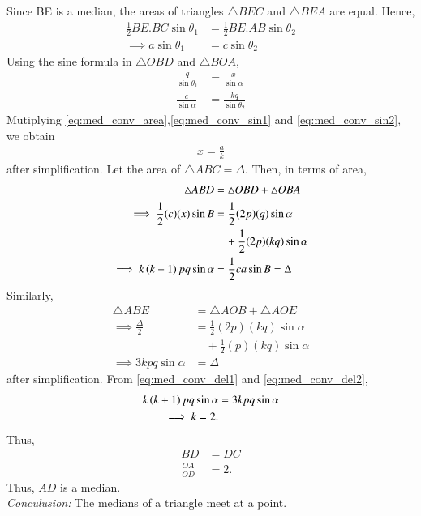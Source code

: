 \proof Since BE is a median, the areas of  triangles  $\triangle BEC$ and $\triangle BEA$ are equal. Hence,
\begin{align}
\frac{1}{2}BE.BC\sin \theta_1 &= \frac{1}{2}BE.AB\sin \theta_2
\\
\implies a\sin \theta_1 &= c\sin \theta_2
\label{eq:med_conv_area}
\end{align}
%
Using the sine formula in $\triangle OBD$ and $\triangle BOA$,
\begin{align}
\label{eq:med_conv_sin1}
\frac{q}{\sin \theta_1} &= \frac{x}{\sin \alpha} 
\\
\frac{c}{\sin \alpha} &= \frac{kq}{\sin \theta_2}
\label{eq:med_conv_sin2}
\end{align}
Mutiplying \eqref{eq:med_conv_area},\eqref{eq:med_conv_sin1}
and \eqref{eq:med_conv_sin2},
%
we obtain
\begin{align}
x = \frac{a}{k}
\label{eq:med_conv_ak}
\end{align}
after simplification.
Let the area of $\triangle ABC = \Delta$. Then, in terms of area,
\begin{align}
\triangle ABD &= \triangle OBD + \triangle OBA
\\
\implies \frac{1}{2}(c)(x)\sin B &=\frac{1}{2}(2p)(q)\sin \alpha 
\\
&\quad + \frac{1}{2}(2p)(kq)\sin \alpha
\\
\implies k\left(k+1\right)pq \sin \alpha  &= \frac{1}{2}ca \sin B = \Delta
\label{eq:med_conv_del1}
\end{align}
%
Similarly,
\begin{align}
\triangle ABE &= \triangle AOB + \triangle AOE
\\
\implies \frac{\Delta}{2} &=\frac{1}{2}(2p)(kq)\sin \alpha 
\\
&\quad + \frac{1}{2}(p)(kq)\sin \alpha
\\
\implies 3kpq \sin \alpha  &=  \Delta
\label{eq:med_conv_del2}
\end{align}
%
after simplification. From \eqref{eq:med_conv_del1}
and \eqref{eq:med_conv_del2},
%
\begin{align}
k\left(k+1\right)pq \sin \alpha &=  3kpq \sin \alpha  
\\
\implies k = 2.
\end{align}
Thus, 
\begin{align}
BD &= DC
\\
\frac{OA}{OD} &= 2.
\end{align}
Thus, $AD$ is a median.
\\
{\em Conculusion:} The medians of a triangle meet at a point.